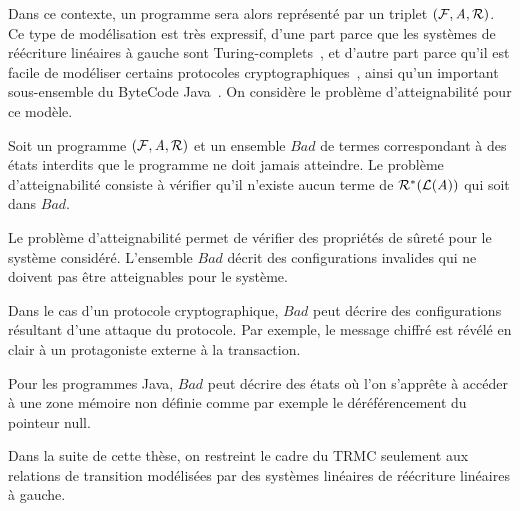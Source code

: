 \noindent
Dans ce contexte, un programme sera alors représenté par un triplet $(\mathcal{F},\mathit A,\mathcal R)$.
Ce type de modélisation est très expressif, d'une part parce que les systèmes de réécriture
linéaires à gauche sont Turing-complets~\cite{HUET-78}, et d'autre part parce qu'il est facile de 
modéliser certains protocoles cryptographiques~\cite{GenetK-CADE00}, ainsi qu'un
important sous-ensemble du ByteCode Java~\cite{BoichutGJL-RTA07}.
On considère le problème d'atteignabilité pour ce modèle.

\begin{definition}
\label{def:reachability}
Soit un programme $(\mathcal{F},\mathit A,\mathcal R)$ et un ensemble $Bad$ de termes correspondant à des états
interdits que le programme ne doit jamais atteindre.
Le problème d'atteignabilité consiste à vérifier qu'il n'existe 
aucun terme de $\mathcal R^*(\mathcal{L}(\mathit A))$ qui soit dans $Bad$.
\end{definition}

Le problème d'atteignabilité permet de vérifier des propriétés de sûreté
pour le système considéré. L'ensemble $Bad$ décrit des configurations invalides 
qui ne doivent pas être atteignables pour le système.

Dans le cas d'un protocole cryptographique, $Bad$ peut décrire des
configurations résultant d'une attaque du protocole. Par exemple, le message
chiffré est révélé en clair à un protagoniste externe à la
transaction.

Pour les programmes Java, $Bad$ peut décrire des états où l'on
s'apprête à accéder à une zone mémoire non définie comme par exemple 
le déréférencement du pointeur null.

Dans la suite de cette thèse, on restreint le cadre du TRMC seulement
aux relations de transition modélisées par des systèmes linéaires de
réécriture linéaires à gauche.

